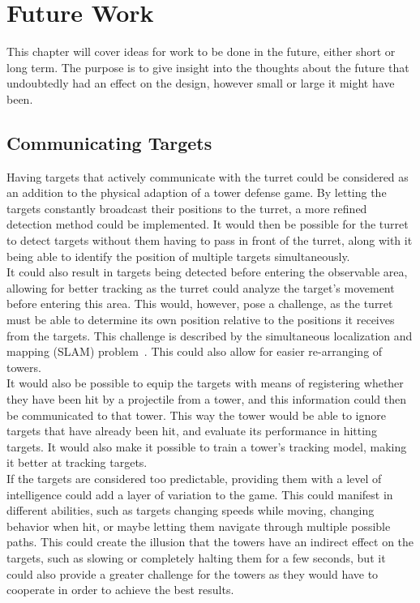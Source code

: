 \chapter{Future Work}\label{ch:futurework}
This chapter will cover ideas for work to be done in the future, either short or long term. The purpose is to give insight into the thoughts about the future that undoubtedly had an effect on the design, however small or large it might have been.
\section{Communicating Targets}
Having targets that actively communicate with the turret could be considered as an addition to the physical adaption of a tower defense game. By letting the targets constantly broadcast their positions to the turret, a more refined detection method could be implemented. It would then be possible for the turret to detect targets without them having to pass in front of the turret, along with it being able to identify the position of multiple targets simultaneously. \\

It could also result in targets being detected before entering the observable area, allowing for better tracking as the turret could analyze the target's movement before entering this area. This would, however, pose a challenge, as the turret must be able to determine its own position relative to the positions it receives from the targets. This challenge is described by the simultaneous localization and mapping (SLAM) problem~\cite{SLAM}. This could also allow for easier re-arranging of towers. \\

It would also be possible to equip the targets with means of registering whether they have been hit by a projectile from a tower, and this information could then be communicated to that tower. This way the tower would be able to ignore targets that have already been hit, and evaluate its performance in hitting targets. It would also make it possible to train a tower's tracking model, making it better at tracking targets. \\

If the targets are considered too predictable, providing them with a level of intelligence could add a layer of variation to the game. This could manifest in different abilities, such as targets changing speeds while moving, changing behavior when hit, or maybe letting them navigate through multiple possible paths. This could create the illusion that the towers have an indirect effect on the targets, such as slowing or completely halting them for a few seconds, but it could also provide a greater challenge for the towers as they would have to cooperate in order to achieve the best results.



